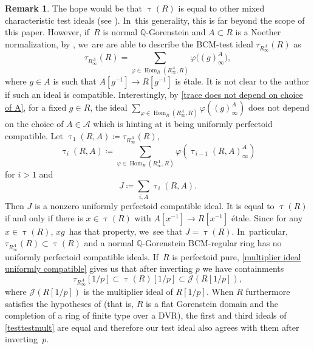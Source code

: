 \documentclass[11pt]{article}
\let\autoref\cref
\theoremstyle{plain}
\theoremstyle{definition}
\newtheorem{remark}[theorem]{Remark}
\numberwithin{equation}{theorem}
\newcommand{\Q}{\mathbb {Q}}
\DeclareMathOperator{\Hom}{Hom}
\newcommand{\sA}{\mathcal{A}}
\newcommand{\sJ}{\mathcal{J}}
\renewcommand{\phi}{\varphi}
\newcommand{\inv}{^{-1}}
\newcommand{\rafty}{R^A_\infty}
\begin{document}
\begin{remark}
The hope would be that $\uptau(R)$ is equal to other mixed characteristic test ideals (see \cite{MaSchwedePerfectoidTestIdeal,HaconLamarcheSchwedeGlobalGenTestIdeal,BMPSTWWMinimalModelProgramMixedCharacteristic,BMPSTWWDTestIdealPerturbation,MurayamaUniformBoundsSymbolicPowers,RobinsonBCMTestIdealToric,SatoTakagiDeformationFPureFreg,PerezRGCharacteristicFreeTestIdeals}). In~this generality, this is far beyond the scope of this paper. However, if~$R$ is normal $\Q$-Gorenstein and $A\subset R$ is a Noether normalization, by \cite[Lem.\,5.1.6]{CaiLeeMaSchwedeTuckerPerfectoidSignature}, we~are are able to describe the BCM-test ideal $\tau_{\rafty}(R)$ as
\[
\tau_{\rafty}(R)=\sum_{\phi\in \Hom_R\left(\rafty,R\right)}\phi\bigl((g)^A_\infty\bigr),
\]
where $g\in A$ is such that $A[g\inv]\to R[g\inv]$ is étale.
It is not clear to the author if such an ideal is compatible. Interestingly, by \autoref{trace does not depend on choice of A}, for a fixed $g\in R$, the ideal $\sum_{\phi\in \Hom_R\left(\rafty,R\right)}\phi\left((g)^A_\infty\right)$ does not depend on the choice of $A\in \sA$ which is hinting at it being uniformly perfectoid compatible.
Let $\uptau_1(R,A)\coloneqq \tau_{\rafty}(R)$,
\[\uptau_i(R,A)\coloneqq \sum_{\phi\in \Hom_R\left(\rafty,R\right)}\phi\left(\uptau_{i-1}(R,A)^A_\infty\right)\]
for $i>1$ and
\[
J\coloneqq \sum_{i,A} \uptau_i(R,A).
\]
Then $J$ is a nonzero uniformly perfectoid compatible ideal. It is equal to $\uptau(R)$ if and only if there is $x\in \uptau(R)$ with $A[x\inv]\to R[x\inv]$ étale. Since for any $x\in \uptau(R)$, $xg$~has that property, we~see that $J=\uptau(R)$. In~particular, $\tau_{\rafty}(R)\subset \uptau(R)$ and a normal $\Q$-Gorenstein BCM-regular ring has no uniformly perfectoid compatible ideals. If~$R$ is perfectoid pure, \autoref{multiplier ideal uniformly compatible} gives us that after inverting $p$ we have containments
\begin{equation}\label{testtestmult}
\tau_{\rafty}[1/p]\subset \uptau(R)[1/p]\subset \sJ(R[1/p]),
\end{equation}
where $\sJ(R[1/p])$ is the multiplier ideal of $R[1/p]$.
When $R$ furthermore satisfies the hypotheses of \cite[Th.\,B]{BMPSTWWDTestIdealPerturbation} (that is, $R$ is a flat Gorenstein domain and the completion of a ring of finite type over a DVR), the first and third ideals of \autoref{testtestmult} are equal and therefore our test ideal also agrees with them after inverting~$p$.
\end{remark}
\end{document}
